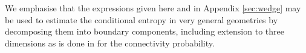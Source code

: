 \documentclass{article}
\newcommand{\red}[1]{\textcolor{red}{#1}}
\begin{document}
        
         We emphasise that the expressions given here and in Appendix \ref{sec:wedge} may be used to estimate the conditional entropy in very general geometries by decomposing them into boundary components, including extension to three dimensions as is done in \cite{dettmann2016random} for the connectivity probability. 
        
        


\end{document}
